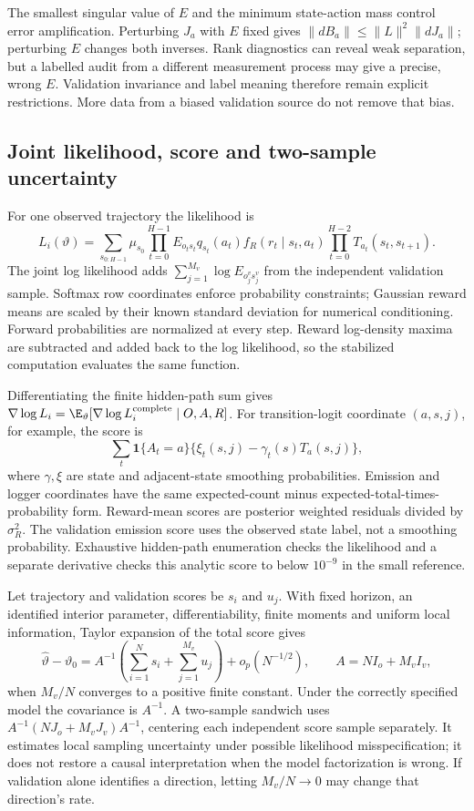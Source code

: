 The smallest singular value of $E$ and the minimum state-action mass control
error amplification. Perturbing $J_a$ with $E$ fixed gives
$\|dB_a\|\le\|L\|^2\|dJ_a\|$; perturbing $E$ changes both inverses.
Rank diagnostics can reveal weak separation, but a labelled audit from a
different measurement process may give a precise, wrong $E$. Validation
invariance and label meaning therefore remain explicit restrictions.
More data from a biased validation source do not remove that bias.

\subsection{Joint likelihood, score and two-sample uncertainty}
For one observed trajectory the likelihood is
\[
 L_i(\vartheta)=\sum_{s_{0:H-1}}\mu_{s_0}
 \prod_{t=0}^{H-1}E_{o_t s_t}q_{s_t}(a_t)
       f_R(r_t\mid s_t,a_t)
 \prod_{t=0}^{H-2}T_{a_t}(s_t,s_{t+1}).
\]
The joint log likelihood adds $\sum_{j=1}^{M_v}\log E_{o_j^v s_j^v}$
from the independent validation sample. Softmax row coordinates enforce
probability constraints; Gaussian reward means are scaled by their known
standard deviation for numerical conditioning. Forward probabilities are
normalized at every step. Reward log-density maxima are subtracted and
added back to the log likelihood, so the stabilized computation evaluates
the same function.

Differentiating the finite hidden-path sum gives
$\nabla\log L_i=\E_\vartheta[\nabla\log L_i^{\rm complete}\mid O,A,R]$.
For transition-logit coordinate $(a,s,j)$, for example, the score is
\[
 \sum_t\mathbf1\{A_t=a\}
 \{\xi_t(s,j)-\gamma_t(s)T_a(s,j)\},
\]
where $\gamma,\xi$ are state and adjacent-state smoothing probabilities.
Emission and logger coordinates have the same expected-count minus
expected-total-times-probability form. Reward-mean scores are posterior
weighted residuals divided by $\sigma_R^2$. The validation emission score
uses the observed state label, not a smoothing probability. Exhaustive
hidden-path enumeration checks the likelihood and a separate derivative
checks this analytic score to below $10^{-9}$ in the small reference.

Let trajectory and validation scores be $s_i$ and $u_j$. With fixed horizon,
an identified interior parameter, differentiability, finite moments and
uniform local information, Taylor expansion of the total score gives
\[
 \hat\vartheta-\vartheta_0=
 A^{-1}\left(\sum_{i=1}^Ns_i+\sum_{j=1}^{M_v}u_j\right)
 +o_p(N^{-1/2}),\qquad
 A=N I_o+M_v I_v,
\]
when $M_v/N$ converges to a positive finite constant. Under the correctly
specified model the covariance is $A^{-1}$. A two-sample sandwich uses
$A^{-1}(N J_o+M_v J_v)A^{-1}$, centering each independent score sample
separately. It estimates local sampling uncertainty under possible
likelihood misspecification; it does not restore a causal interpretation
when the model factorization is wrong. If validation alone identifies a
direction, letting $M_v/N\to0$ may change that direction's rate.

